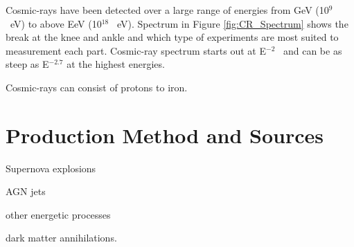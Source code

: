 Cosmic-rays have been detected over a large range of energies from GeV (10$^9$ \ eV) to above EeV (10$^18$ \ eV). Spectrum in Figure \ref{fig:CR_Spectrum} shows the break at the knee and ankle and which type of experiments are most suited to measurement each part. Cosmic-ray spectrum starts out at E$^{-2}$ \ and can be as steep as E$^{-2.7}$ at the highest energies.

Cosmic-rays can consist of protons to iron. 

\section{Production Method and Sources}

Supernova explosions 

AGN jets

other energetic processes

dark matter annihilations.